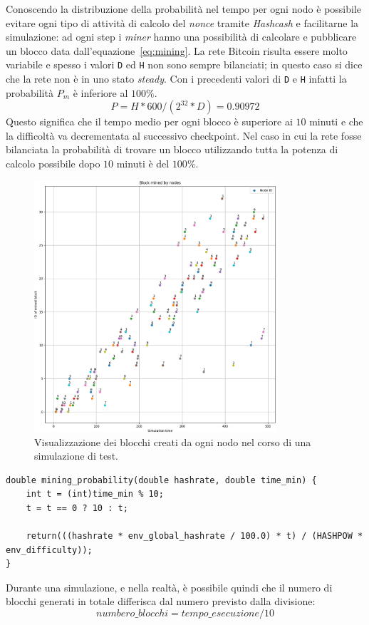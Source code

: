 Conoscendo la distribuzione della probabilità nel tempo per ogni nodo è possibile evitare ogni tipo di attività di calcolo del \textit{nonce} tramite \textit{Hashcash} e facilitarne la simulazione: ad ogni step i \textit{miner} hanno una possibilità di calcolare e pubblicare un blocco data dall'equazione~\ref{eq:mining}.
La rete Bitcoin risulta essere molto variabile e spesso i valori \texttt{D} ed \texttt{H} non sono sempre bilanciati; in questo caso si dice che la rete non è in uno stato \textit{steady}. Con i precedenti valori di \texttt{D} e \texttt{H} infatti la probabilità $P_m$ è inferiore al $100\%$.
\begin{equation}
    P = H * 600 / (2^{32} * D) = 0.90972%
\end{equation}
Questo significa che il tempo medio per ogni blocco è superiore ai $10$ minuti e che la difficoltà va decrementata al successivo checkpoint.
Nel caso in cui la rete fosse bilanciata la probabilità di trovare un blocco utilizzando tutta la potenza di calcolo possibile dopo $10$ minuti è del $100\%$.
\begin{figure}
    \centering
    \includegraphics[width=0.8\textwidth]{images/blockmined.png}
    \caption{Visualizzazione dei blocchi creati da ogni nodo nel corso di una simulazione di test.}
\end{figure}
\clearpage
\begin{code}
\begin{verbatim}
double mining_probability(double hashrate, double time_min) {
    int t = (int)time_min % 10;
    t = t == 0 ? 10 : t;

    return(((hashrate * env_global_hashrate / 100.0) * t) / (HASHPOW * env_difficulty));
}
\end{verbatim}
\end{code}
Durante una simulazione, e nella realtà, è possibile quindi che il numero di blocchi generati in totale differisca dal numero previsto dalla divisione:
\begin{equation}
    numbero\_blocchi = tempo\_esecuzione/10
\end{equation}

